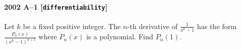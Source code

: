 \paragraph{2002 A--1 \textnormal{[\texttt{differentiability}]}}
Let $k$ be a fixed positive integer. The $n$-th derivative of
$\frac{1}{x^k - 1}$ has the form $\frac{P_n(x)}{(x^k - 1)^{n+1}}$
where $P_n(x)$ is a polynomial. Find $P_n(1)$.
